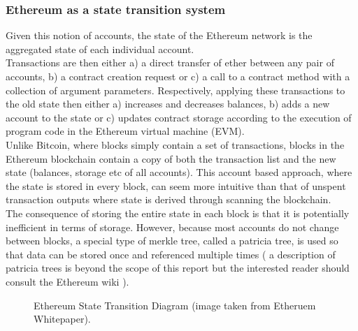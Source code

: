 \subsubsection{Ethereum as a state transition system}
Given this notion of accounts, the state of the Ethereum network is the aggregated state of each individual account. \\

Transactions are then either a) a direct transfer of ether between any pair of accounts, b) a contract creation request or c) a call to a contract method with a collection of argument parameters. Respectively, applying these transactions to the old state then either a) increases and decreases balances, b) adds a new account to the state or c) updates contract storage according to the execution of program code in the Ethereum virtual machine (EVM). \\

Unlike Bitcoin, where blocks simply contain a set of transactions, blocks in the Ethereum blockchain contain a copy of both the transaction list and the new state (balances, storage etc of all accounts). This account based approach, where the state is stored in every block, can seem more intuitive than that of unspent transaction outputs where state is derived through scanning the blockchain.\\

The consequence of storing the entire state in each block is that it is potentially inefficient in terms of storage. However, because most accounts do not change between blocks, a special type of merkle tree, called a patricia tree, is used so that data can be stored once and referenced multiple times ( a description of patricia trees is beyond the scope of this report but the interested reader should consult the Ethereum wiki \cite{Patricia}).\\

\begin{figure}
\centering
{}
\decoRule
\caption[Ethereum State Transition Diagram]{Ethereum State Transition Diagram (image taken from Etheruem Whitepaper\cite{Ethereum}).}
\label{fig:ethereum_transition}
\end{figure}

